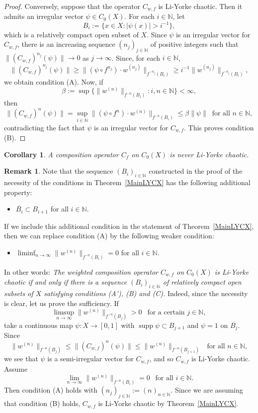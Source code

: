 \documentclass[12pt]{amsart}
\theoremstyle{theorem}
\newtheorem{corollary}[theorem]{Corollary}
\theoremstyle{definition}
\newtheorem{remark}[theorem]{Remark}
\theoremstyle{remark} \theoremstyle{question} \theoremstyle{example}
\newcommand{\N}{\mathbb{N}}
\newcommand{\supp}{\operatorname{supp}}
\newcommand{\ov} {\overline}
\begin{document}
\begin{proof}
\smallskip
Conversely, suppose that the operator $C_{w,f}$ is Li-Yorke chaotic. Then it admits an irregular vector $\psi \in C_0(X)$. 
For each $i \in \N$, let
\[
B_i\!:= \{x \in X : |\psi(x)| > i^{-1}\},
\]
which is a relatively compact open subset of $X$.  
Since $\psi$ is an irregular vector for $C_{w,f}$, there is an increasing sequence $(n_j)_{j \in \N}$ of positive integers such that
$\|(C_{w,f})^{n_j}(\psi)\| \to 0$ as $j \to \infty$. Since, for each $i \in \N$,
\[
\|(C_{w,f})^{n_j}(\psi)\| \geq \|(\psi \circ f^{n_j}) \cdot w^{(n_j)}\|_{f^{-n_j}(B_i)} \geq i^{-1} \|w^{(n_j)}\|_{f^{-n_j}(B_i)},
\]
we obtain condition (A). Now, if 
\[
\beta\!:= \sup\big\{\|w^{(n)}\|_{f^{-n}(B_i)} : i,n \in \N\big\} < \infty,
\]
then
\[
\|(C_{w,f})^n(\psi)\| = \sup_{i \in \N} \|(\psi \circ f^n) \cdot w^{(n)}\|_{f^{-n}(B_i)} \leq \beta \|\psi\| \ \text{ for all } n \in \N,
\]
contradicting the fact that $\psi$ is an irregular vector for $C_{w,f}$. This proves condition (B).
\end{proof}

\begin{corollary}
A composition operator $C_f$ on $C_0(X)$ is never Li-Yorke chaotic.
\end{corollary}

\begin{remark}
Note that the sequence $(B_i)_{i \in \N}$ constructed in the proof of the necessity of the conditions in Theorem~\ref{MainLYCX} 
has the following additional property:
\begin{itemize}
\item [(C)] $\ov{B_i} \subset B_{i+1}$ for all $i \in \N$.
\end{itemize}
If we include this additional condition in the statement of Theorem~\ref{MainLYCX}, then we can replace condition (A) by the following weaker condition:
\begin{itemize}
\item [(A')] $\displaystyle \liminf_{n \to \infty} \|w^{(n)}\|_{f^{-n}(B_i)} = 0$ for all $i \in \N$.
\end{itemize}
In other words: {\it The weighted composition operator $C_{w,f}$ on $C_0(X)$ is Li-Yorke chaotic if and only if there is a sequence 
$(B_i)_{i \in \N}$ of relatively compact open subsets of $X$ satisfying conditions (A'), (B) and (C).}
Indeed, since the necessity is clear, let us prove the sufficiency. If
\[
\limsup_{n \to \infty} \|w^{(n)}\|_{f^{-n}(B_j)} > 0 \ \ \text{ for a certain } j \in \N,
\]
take a continuous map $\psi : X \to [0,1]$ with $\supp \psi \subset B_{j+1}$ and $\psi = 1 \text{ on } \ov{B_j}$. Since
\[
\|w^{(n)}\|_{f^{-n}(B_j)} \leq \|(C_{w,f})^n(\psi)\| \leq \|w^{(n)}\|_{f^{-n}(B_{j+1})} \ \ \text{ for all } n \in \N,
\]
we see that $\psi$ is a semi-irregular vector for $C_{w,f}$, and so $C_{w,f}$ is Li-Yorke chaotic. Assume
\[
\lim_{n \to \infty} \|w^{(n)}\|_{f^{-n}(B_i)} = 0 \ \ \text{ for all } i \in \N.
\]
Then condition (A) holds with $(n_j)_{j \in \N}\!:= (n)_{n \in \N}$. 
Since we are assuming that condition (B) holds, $C_{w,f}$ is Li-Yorke chaotic by Theorem~\ref{MainLYCX}.
\end{remark}
\end{document}
